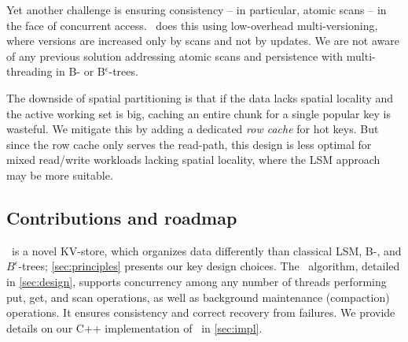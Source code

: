 Yet another challenge is ensuring consistency -- in particular, atomic scans --  in the face of concurrent access. 
\sys\ does this using low-overhead multi-versioning, where versions are increased only by scans and not by updates. 
We are not aware of any previous  solution addressing atomic scans and persistence with multi-threading in B- or
B$^\epsilon$-trees.

The downside of spatial partitioning is that if the data lacks spatial locality and the active working set is big, 
caching an entire chunk for a single popular key is wasteful. We mitigate this  by adding 
a dedicated \emph{row cache} for hot keys. But since the row cache only serves the read-path, 
this design is less optimal for mixed read/write workloads lacking spatial locality,
where the LSM approach may be more suitable.  

\subsection{Contributions and roadmap}

\sys\ is a novel KV-store, which organizes data differently than classical LSM, B-, and $B^{\epsilon}$-trees; \cref{sec:principles} presents our key design choices. 
The \sys\ algorithm, detailed in \cref{sec:design}, supports concurrency among any number of threads performing put, get, and scan operations, as well as background maintenance (compaction)
operations. It ensures consistency and correct recovery from failures. 
We  provide details on our C++ implementation of \sys\ in \cref{sec:impl}. 


